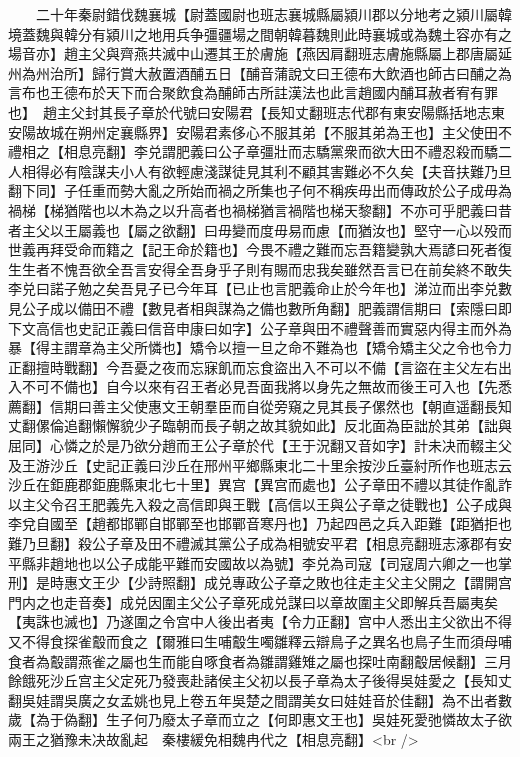　　二十年秦尉錯伐魏襄城【尉蓋國尉也班志襄城縣屬潁川郡以分地考之潁川屬韓境蓋魏與韓分有潁川之地用兵争彊疆場之間朝韓暮魏則此時襄城或為魏土容亦有之場音亦】趙主父與齊燕共滅中山遷其王於膚施【燕因肩翻班志膚施縣屬上郡唐屬延州為州治所】歸行賞大赦置酒酺五日【酺音蒲說文曰王德布大飲酒也師古曰酺之為言布也王德布於天下而合聚飲食為酺師古所註漢法也此言趙國内酺耳赦者宥有罪也】　趙主父封其長子章於代號曰安陽君【長知丈翻班志代郡有東安陽縣括地志東安陽故城在朔州定襄縣界】安陽君素侈心不服其弟【不服其弟為王也】主父使田不禮相之【相息亮翻】李兑謂肥義曰公子章彊壯而志驕黨衆而欲大田不禮忍殺而驕二人相得必有陰謀夫小人有欲輕慮淺謀徒見其利不顧其害難必不久矣【夫音扶難乃旦翻下同】子任重而勢大亂之所始而禍之所集也子何不稱疾毋出而傳政於公子成毋為禍梯【梯猶階也以木為之以升高者也禍梯猶言禍階也梯天黎翻】不亦可乎肥義曰昔者主父以王屬義也【屬之欲翻】曰毋變而度毋易而慮【而猶汝也】堅守一心以殁而世義再拜受命而籍之【記王命於籍也】今畏不禮之難而忘吾籍變孰大焉諺曰死者復生生者不愧吾欲全吾言安得全吾身乎子則有賜而忠我矣雖然吾言已在前矣終不敢失李兑曰諾子勉之矣吾見子已今年耳【已止也言肥義命止於今年也】涕泣而出李兑數見公子成以備田不禮【數見者相與謀為之備也數所角翻】肥義謂信期曰【索隱曰即下文高信也史記正義曰信音申康曰如字】公子章與田不禮聲善而實惡内得主而外為暴【得主謂章為主父所憐也】矯令以擅一旦之命不難為也【矯令矯主父之令也令力正翻擅時戰翻】今吾憂之夜而忘寐飢而忘食盜出入不可以不備【言盜在主父左右出入不可不備也】自今以來有召王者必見吾面我將以身先之無故而後王可入也【先悉薦翻】信期曰善主父使惠文王朝羣臣而自從旁窺之見其長子傫然也【朝直遥翻長知丈翻傫倫追翻懶懈貌少子臨朝而長子朝之故其貌如此】反北面為臣詘於其弟【詘與屈同】心憐之於是乃欲分趙而王公子章於代【王于況翻又音如字】計未决而輟主父及王游沙丘【史記正義曰沙丘在邢州平鄉縣東北二十里余按沙丘臺紂所作也班志云沙丘在鉅鹿郡鉅鹿縣東北七十里】異宫【異宫而處也】公子章田不禮以其徒作亂詐以主父令召王肥義先入殺之高信即與王戰【高信以王與公子章之徒戰也】公子成與李兌自國至【趙都邯鄲自邯鄲至也邯鄲音寒丹也】乃起四邑之兵入距難【距猶拒也難乃旦翻】殺公子章及田不禮滅其黨公子成為相號安平君【相息亮翻班志涿郡有安平縣非趙地也以公子成能平難而安國故以為號】李兑為司寇【司寇周六卿之一也掌刑】是時惠文王少【少詩照翻】成兑專政公子章之敗也往走主父主父開之【謂開宫門内之也走音奏】成兑因圍主父公子章死成兑謀曰以章故圍主父即解兵吾屬夷矣【夷誅也滅也】乃遂圍之令宫中人後出者夷【令力正翻】宫中人悉出主父欲出不得又不得食探雀鷇而食之【爾雅曰生哺鷇生噣雛釋云辯鳥子之異名也鳥子生而須母哺食者為鷇謂燕雀之屬也生而能自啄食者為雛謂雞雉之屬也探吐南翻鷇居候翻】三月餘餓死沙丘宫主父定死乃發喪赴諸侯主父初以長子章為太子後得吳娃愛之【長知丈翻吳娃謂吳廣之女孟姚也見上卷五年吳楚之間謂美女曰娃娃音於佳翻】為不出者數歲【為于偽翻】生子何乃廢太子章而立之【何即惠文王也】吳娃死愛弛憐故太子欲兩王之猶豫未决故亂起　秦樓緩免相魏冉代之【相息亮翻】<br />
